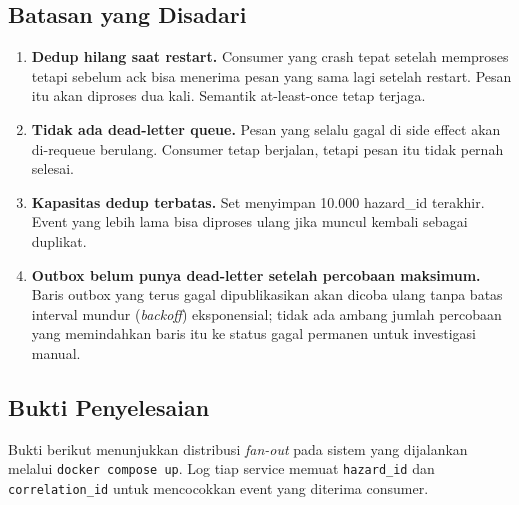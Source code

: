 \subsection{Batasan yang Disadari}
\begin{enumerate}
  \item \textbf{Dedup hilang saat restart.} Consumer yang crash tepat setelah memproses
  tetapi sebelum ack bisa menerima pesan yang sama lagi setelah restart. Pesan itu akan
  diproses dua kali. Semantik at-least-once tetap terjaga.
  \item \textbf{Tidak ada dead-letter queue.} Pesan yang selalu gagal di side effect akan
  di-requeue berulang. Consumer tetap berjalan, tetapi pesan itu tidak pernah selesai.
  \item \textbf{Kapasitas dedup terbatas.} Set menyimpan 10.000 hazard\_id terakhir.
  Event yang lebih lama bisa diproses ulang jika muncul kembali sebagai duplikat.
  \item \textbf{Outbox belum punya dead-letter setelah percobaan maksimum.} Baris outbox
  yang terus gagal dipublikasikan akan dicoba ulang tanpa batas interval mundur
  (\textit{backoff}) eksponensial; tidak ada ambang jumlah percobaan yang memindahkan
  baris itu ke status gagal permanen untuk investigasi manual.
\end{enumerate}

\subsection{Bukti Penyelesaian}
Bukti berikut menunjukkan distribusi \textit{fan-out} pada sistem yang dijalankan
melalui \texttt{docker compose up}. Log tiap service memuat \texttt{hazard\_id}
dan \texttt{correlation\_id} untuk mencocokkan event yang diterima consumer.

